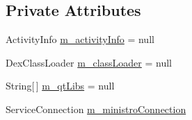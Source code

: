 \subsection*{Private Attributes}
\begin{DoxyCompactItemize}
\item 
Activity\-Info \hyperlink{classorg_1_1kde_1_1necessitas_1_1origo_1_1_qt_activity_adefefee8d1e89be30fc46c957d4efc3a}{m\-\_\-activity\-Info} = null
\item 
Dex\-Class\-Loader \hyperlink{classorg_1_1kde_1_1necessitas_1_1origo_1_1_qt_activity_a74280d673d087888a250d3c182c075b9}{m\-\_\-class\-Loader} = null
\item 
String\mbox{[}$\,$\mbox{]} \hyperlink{classorg_1_1kde_1_1necessitas_1_1origo_1_1_qt_activity_a9d5760ab4fabf51a69e4e981c1ed0ac3}{m\-\_\-qt\-Libs} = null
\item 
Service\-Connection \hyperlink{classorg_1_1kde_1_1necessitas_1_1origo_1_1_qt_activity_ac39b27250b5abe8701c4e96f1450f8e0}{m\-\_\-ministro\-Connection}
\end{DoxyCompactItemize}
